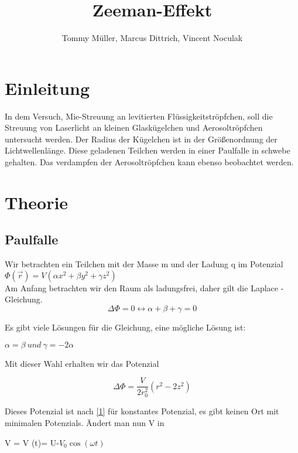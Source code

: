 \documentclass[10pt,a4paper]{article}
\author{Tommy Müller, Marcus Dittrich, Vincent Noculak}
\title{Zeeman-Effekt}
\begin{document}
\maketitle
\newpage
\tableofcontents
\newpage

\section{Einleitung}

In dem Versuch, Mie-Streuung an levitierten Flüssigkeitströpfchen, soll die Streuung von Laserlicht an kleinen Glaskügelchen und Aerosoltröpfchen untersucht werden. Der Radius der Kügelchen ist in der Größenordnung der Lichtwellenlänge. Diese geladenen Teilchen werden in einer Paulfalle in schwebe gehalten. Das verdampfen der Aerosoltröpfchen kann ebenso beobachtet werden.

\section{Theorie}
\subsection{Paulfalle}

Wir betrachten ein Teilchen mit der Masse m und der Ladung q im Potenzial\\

$\Phi(\overrightarrow r) = V (\alpha x^2+\beta y^2+\gamma z^2)$\\


Am Anfang betrachten wir den Raum als ladungsfrei, daher gilt die Laplace - Gleichung.\\
\begin{equation}
\Delta \Phi = 0   \leftrightarrow \alpha + \beta + \gamma = 0
\label {1}
\end{equation}

Es gibt viele Lösungen für die Gleichung, eine mögliche Lösung ist:

$\alpha = \beta\ und\ \gamma = -2 \alpha$

Mit dieser Wahl erhalten wir das Potenzial

\begin{equation}
\Delta \Phi = \frac{V}{2r_0^2}(r^2-2z^2)
\label {2}
\end{equation}

Dieses Potenzial ist nach \ref {1} für konstantes Potenzial, es gibt keinen Ort mit minimalen Potenzials. Ändert man nun V in

V = V (t)= U-$V_0 \cos(\omega t)$
\end{document}
